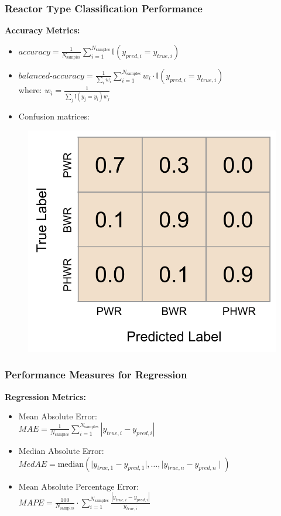 \begin{frame}
  \frametitle{Reactor Type Classification Performance}
  \textbf{Accuracy Metrics:} \cite{scikit}
  \vspace{2mm}
  \begin{itemize}\addtolength{\itemsep}{0.4\baselineskip}
    \item $\textit{accuracy} = \frac{1}{N_\text{samples}} \sum_{i=1}^{N_\text{samples}} 
                               \mathbb{I}(y_{pred,i} = y_{true,i})$
    \item $\textit{balanced-accuracy} = \frac{1}{\sum_{i}{w_i}} \sum_{i=1}^{N_\text{samples}}
                                        w_i \cdot \mathbb{I}(y_{pred, i} = y_{true, i})$ \\
          \hspace{1.1cm} where: $w_i = \frac{1}{\sum_j{\mathbb{I}(y_j = y_i) w_j}}$
    \item Confusion matrices: 
  \end{itemize}
  \begin{figure}
    \centering
    \includegraphics[width=0.35\linewidth]{./figures/cm_example.png}
  \end{figure}
\end{frame}

\begin{frame}
  \frametitle{Performance Measures for Regression}
  \textbf{Regression Metrics:} \cite{scikit}
  \vspace{2mm}
  \begin{itemize}\addtolength{\itemsep}{0.4\baselineskip}
    \item Mean Absolute Error:\\ \vspace{2mm}
          $\textit{MAE} = \frac{1}{N_{\text{samples}}} \sum_{i=1}^{N_{\text{samples}}} \left| y_{true, i} - y_{pred, i} \right|$
    \item Median Absolute Error:\\ \vspace{2mm}
          $\textit{MedAE} = \text{median}(\mid y_{true, 1} - y_{pred, 1} \mid, \ldots, 
                                          \mid y_{true, n} - y_{pred, n} \mid)$
    \item Mean Absolute Percentage Error:\\ \vspace{2mm}
          $\textit{MAPE} =  \frac{100}{N_{\text{samples}}} \cdot 
                            \sum_{i=1}^{N_{\text{samples}}}
                            \frac{\left| y_{true, i} - y_{pred, i} \right|}{y_{true, i}}$
  \end{itemize}
\end{frame}

